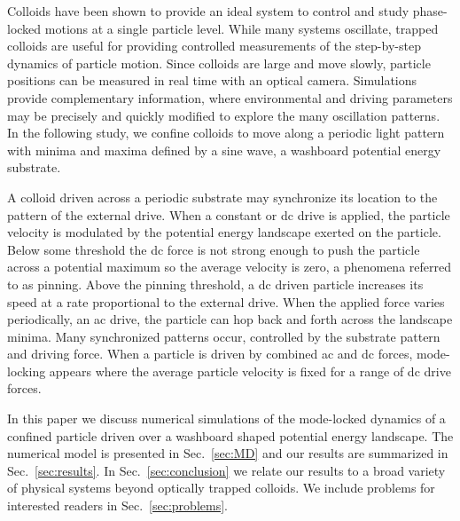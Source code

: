 \documentclass[preprint,showpacs,preprintnumbers,amsmath,amssymb,aps,prb]{revtex4-1}
\theoremstyle{remark}
\begin{document}
Colloids have been
shown to 
provide an ideal system to 
control and study
phase-locked motions
at a single particle level.\cite{Juniper2015,Juniper2017}
While many systems oscillate,
trapped colloids are useful for 
providing controlled 
measurements of the
step-by-step dynamics of particle motion.
Since
colloids are large 
and move slowly, 
particle positions 
can be measured in real time 
with an optical camera.\cite{Pertsinidis2001}
Simulations provide complementary
information,
where environmental and driving parameters may be precisely
and quickly modified to explore
the many oscillation patterns.
In the following study,
we confine colloids  
to move along a periodic light pattern
with minima and maxima defined by a sine wave,
a washboard potential energy substrate.

A colloid driven across a periodic
substrate may 
synchronize its location
to the pattern of the external drive.
When 
a constant or 
dc drive is applied,
the particle velocity is modulated by 
the potential energy landscape exerted on the particle.   
Below some threshold  
the dc force is not strong enough to push the particle
across a potential maximum so the average velocity is zero,
a phenomena referred to as pinning.\cite{Reichhardt2017}
Above the pinning threshold,
a dc driven particle
increases its speed at a rate proportional
to the external drive.  
When the applied force varies periodically,
an ac drive,
the particle can hop back and forth across
the landscape minima.
Many synchronized patterns occur,
controlled by the substrate pattern and driving force.
When a particle is driven by combined 
ac and dc forces,
mode-locking appears 
where 
the average particle velocity
is fixed for a range of dc drive forces.\cite{Reichhardt2015}

In this paper we discuss numerical simulations 
of the mode-locked dynamics
of a confined particle driven over
a washboard shaped potential energy landscape.
The numerical model is presented in Sec.~\ref{sec:MD} and 
our results are summarized in
Sec.~\ref{sec:results}. In Sec.~\ref{sec:conclusion}
we relate  our results 
to a broad variety of physical systems beyond 
optically trapped colloids.
We include problems for interested readers 
in Sec.~\ref{sec:problems}.
\end{document}
